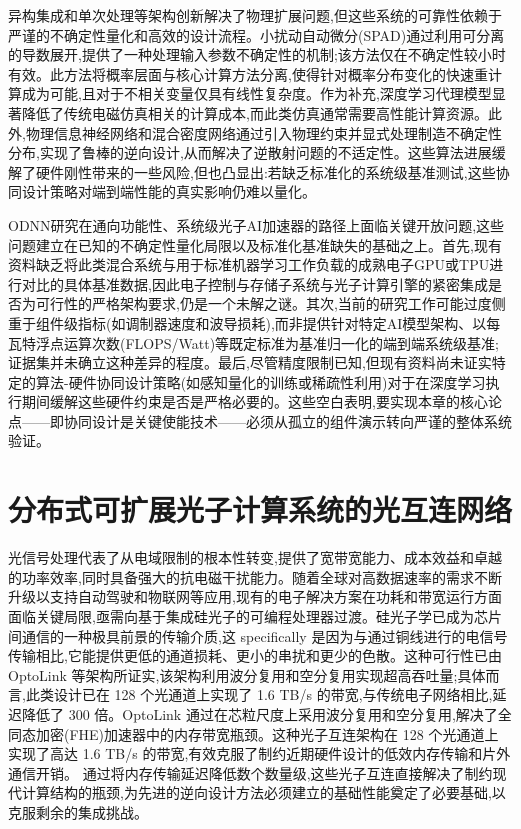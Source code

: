 \documentclass[11pt]{article}
\begin{document}
异构集成和单次处理等架构创新解决了物理扩展问题,但这些系统的可靠性依赖于严谨的不确定性量化和高效的设计流程。小扰动自动微分(SPAD)通过利用可分离的导数展开,提供了一种处理输入参数不确定性的机制;该方法仅在不确定性较小时有效。此方法将概率层面与核心计算方法分离,使得针对概率分布变化的快速重计算成为可能,且对于不相关变量仅具有线性复杂度。作为补充,深度学习代理模型显著降低了传统电磁仿真相关的计算成本,而此类仿真通常需要高性能计算资源。此外,物理信息神经网络和混合密度网络通过引入物理约束并显式处理制造不确定性分布,实现了鲁棒的逆向设计,从而解决了逆散射问题的不适定性。这些算法进展缓解了硬件刚性带来的一些风险,但也凸显出:若缺乏标准化的系统级基准测试,这些协同设计策略对端到端性能的真实影响仍难以量化。\citep{s2_964fe0d656467421d5df282abd0e0a2aca877e7e_399e029e} \citep{doi_10_1109_sbfotoniopc62248_2024_10813471_692f0088} \citep{s2_037e66f37189104d61c0d000de0cee202b7eec9e_d15b8018}

ODNN研究在通向功能性、系统级光子AI加速器的路径上面临关键开放问题,这些问题建立在已知的不确定性量化局限以及标准化基准缺失的基础之上。首先,现有资料缺乏将此类混合系统与用于标准机器学习工作负载的成熟电子GPU或TPU进行对比的具体基准数据,因此电子控制与存储子系统与光子计算引擎的紧密集成是否为可行性的严格架构要求,仍是一个未解之谜。其次,当前的研究工作可能过度侧重于组件级指标(如调制器速度和波导损耗),而非提供针对特定AI模型架构、以每瓦特浮点运算次数(FLOPS/Watt)等既定标准为基准归一化的端到端系统级基准;证据集并未确立这种差异的程度。最后,尽管精度限制已知,但现有资料尚未证实特定的算法-硬件协同设计策略(如感知量化的训练或稀疏性利用)对于在深度学习执行期间缓解这些硬件约束是否是严格必要的。这些空白表明,要实现本章的核心论点------即协同设计是关键使能技术------必须从孤立的组件演示转向严谨的整体系统验证。

\section{分布式可扩展光子计算系统的光互连网络}\label{ux5206ux5e03ux5f0fux53efux6269ux5c55ux5149ux5b50ux8ba1ux7b97ux7cfbux7edfux7684ux5149ux4e92ux8fdeux7f51ux7edc}

光信号处理代表了从电域限制的根本性转变,提供了宽带宽能力、成本效益和卓越的功率效率,同时具备强大的抗电磁干扰能力。随着全球对高数据速率的需求不断升级以支持自动驾驶和物联网等应用,现有的电子解决方案在功耗和带宽运行方面面临关键局限,亟需向基于集成硅光子的可编程处理器过渡。硅光子学已成为芯片间通信的一种极具前景的传输介质,这 specifically 是因为与通过铜线进行的电信号传输相比,它能提供更低的通道损耗、更小的串扰和更少的色散。这种可行性已由 OptoLink 等架构所证实,该架构利用波分复用和空分复用实现超高吞吐量;具体而言,此类设计已在 128 个光通道上实现了 1.6 TB/s 的带宽,与传统电子网络相比,延迟降低了 300 倍。OptoLink 通过在芯粒尺度上采用波分复用和空分复用,解决了全同态加密(FHE)加速器中的内存带宽瓶颈。这种光子互连架构在 128 个光通道上实现了高达 1.6 TB/s 的带宽,有效克服了制约近期硬件设计的低效内存传输和片外通信开销。\citep{doi_10_1145_3806395_315ab915} 通过将内存传输延迟降低数个数量级,这些光子互连直接解决了制约现代计算结构的瓶颈,为先进的逆向设计方法必须建立的基础性能奠定了必要基础,以克服剩余的集成挑战。\citep{doi_10_1109_access_2020_3013116_8fec1fb2} \citep{doi_10_1145_3806395_315ab915} \citep{doi_10_1007_s11082_024_08009_8_0f7f241e}
\end{document}
